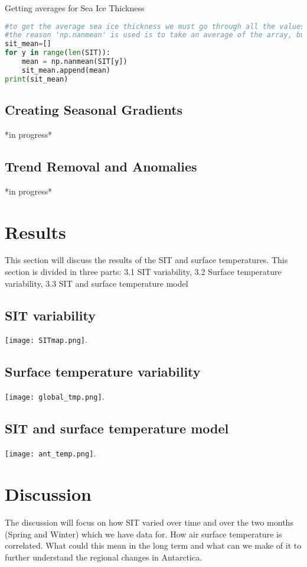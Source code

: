 \documentclass{article}
\begin{document}
Getting averages for Sea Ice Thickness
\begin{lstlisting}[language=Python]
#to get the average sea ice thickness we must go through all the values and do so with a for loop
#the reason 'np.nanmean' is used is to take an average of the array, but because values do not exist for every lat and lon for the array
sit_mean=[]
for y in range(len(SIT)):
    mean = np.nanmean(SIT[y])
    sit_mean.append(mean)
print(sit_mean)
\end{lstlisting}

\subsection{Creating Seasonal Gradients}
*in progress*
\subsection{Trend Removal and Anomalies}
*in progress*


\section{Results}
This section will discuss the results of the SIT and surface temperatures. This section is divided in three parts: 3.1 SIT variability, 3.2 Surface temperature variability, 3.3 SIT and surface temperature model 
\subsection{SIT variability}
\texttt{[image: SITmap.png]}.
\subsection{Surface temperature variability}
\texttt{[image: global\_tmp.png]}.
\subsection{SIT and surface temperature model }
\texttt{[image: ant\_temp.png]}.






\section{Discussion}
The discussion will focus on how SIT varied over time and over the two months (Spring and Winter) which we have data for. How air surface temperature is correlated. What could this mean in the long term and what can we make of it to further understand the regional changes in Antarctica. 
\end{document}
